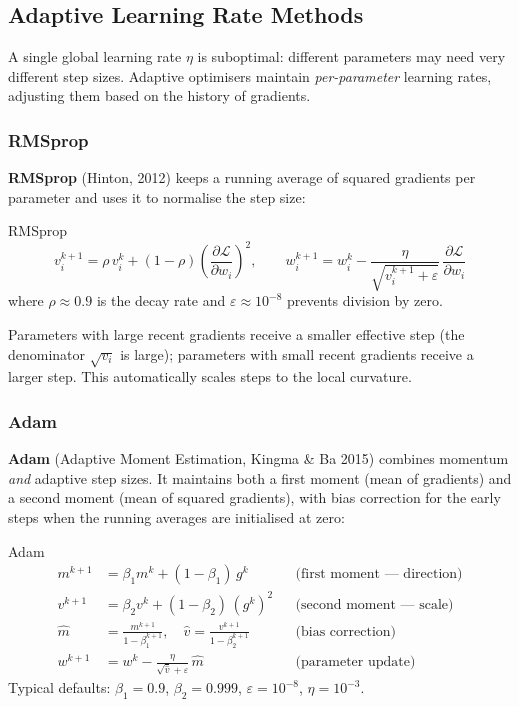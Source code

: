\documentclass[11pt,a4paper]{article}
\newcommand{\term}[1]{\textcolor{DefGreen}{\textbf{#1}}}
\begin{document}
\subsection{Adaptive Learning Rate Methods}

A single global learning rate $\eta$ is suboptimal: different parameters may need very different step sizes. Adaptive optimisers maintain \emph{per-parameter} learning rates, adjusting them based on the history of gradients.

\subsubsection{RMSprop}

\term{RMSprop} (Hinton, 2012) keeps a running average of squared gradients per parameter and uses it to normalise the step size:

\begin{defbox}{RMSprop}
\[
v_i^{k+1} = \rho\, v_i^k + (1-\rho)\left(\frac{\partial \mathcal{L}}{\partial w_i}\right)^{\!2}, \qquad
w_i^{k+1} = w_i^k - \frac{\eta}{\sqrt{v_i^{k+1} + \varepsilon}}\,\frac{\partial \mathcal{L}}{\partial w_i}
\]
where $\rho \approx 0.9$ is the decay rate and $\varepsilon \approx 10^{-8}$ prevents division by zero.
\end{defbox}

Parameters with large recent gradients receive a smaller effective step (the denominator $\sqrt{v_i}$ is large); parameters with small recent gradients receive a larger step. This automatically scales steps to the local curvature.

\subsubsection{Adam}

\term{Adam} (Adaptive Moment Estimation, Kingma \& Ba 2015) combines momentum \emph{and} adaptive step sizes. It maintains both a first moment (mean of gradients) and a second moment (mean of squared gradients), with bias correction for the early steps when the running averages are initialised at zero:

\begin{defbox}{Adam}
\begin{align*}
m^{k+1} &= \beta_1 m^k + (1-\beta_1)\,g^k & &\text{(first moment — direction)} \\
v^{k+1} &= \beta_2 v^k + (1-\beta_2)\,(g^k)^2 & &\text{(second moment — scale)} \\
\hat{m}  &= \frac{m^{k+1}}{1-\beta_1^{k+1}}, \quad \hat{v} = \frac{v^{k+1}}{1-\beta_2^{k+1}} & &\text{(bias correction)} \\
w^{k+1} &= w^k - \frac{\eta}{\sqrt{\hat{v}} + \varepsilon}\,\hat{m} & &\text{(parameter update)}
\end{align*}
Typical defaults: $\beta_1 = 0.9$, $\beta_2 = 0.999$, $\varepsilon = 10^{-8}$, $\eta = 10^{-3}$.
\end{defbox}
\end{document}
